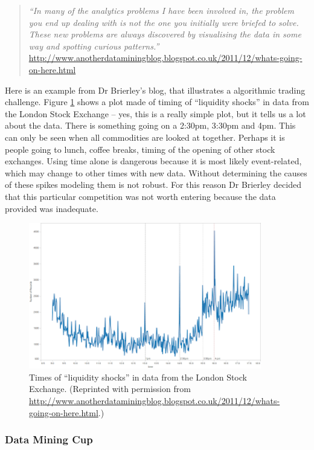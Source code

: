 \documentclass{article}
\begin{document}
\begin{quote}
{\em ``In many of the analytics problems I have been involved in, the problem you end up dealing with is not the one you initially were briefed to solve.
These new problems are always discovered by visualising the data in some way and spotting curious patterns.'' }\url{http://www.anotherdataminingblog.blogspot.co.uk/2011/12/whats-going-on-here.html}
\end{quote}

Here is an example from Dr Brierley's blog, that illustrates a algorithmic trading challenge. Figure \ref{liqshock} shows a plot made of timing of ``liquidity shocks'' in data from the London Stock Exchange -- yes, this is a really simple plot, but it tells us a lot about the data. There is something going on a 2:30pm, 3:30pm and 4pm. This can only be seen when all commodities are looked at together. Perhaps it is people going to lunch, coffee breaks, timing of the opening of other stock exchanges. Using time alone is dangerous because it is most likely event-related, which may change to other times with new data. Without determining the causes of these spikes modeling them is not robust. For this reason Dr Brierley decided that this particular competition was not worth entering because the data provided was inadequate.

\begin{figure}
\centerline{\includegraphics[width=4in]{images/shockeventtimings.png}}
\caption{Times of ``liquidity shocks'' in data from the London Stock Exchange. (Reprinted with permission from \url{http://www.anotherdataminingblog.blogspot.co.uk/2011/12/whats-going-on-here.html}.)}
\label{liqshock}
\end{figure}

\subsubsection{Data Mining Cup}
\end{document}
